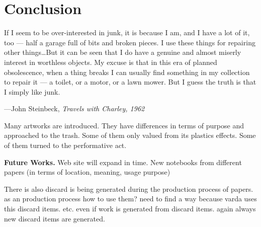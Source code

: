 \chapter{Conclusion}



\epigraph{If I seem to be over-interested in junk, it is because I am, and I have a lot of it, too --- half a garage full of bits and broken pieces. I use these things for repairing other things\ldots But it can be seen that I do have a genuine and almost miserly interest in worthless objects. My excuse is that in this era of planned obsolescence, when a thing breaks I can usually find something in my collection to repair it --- a toilet, or a motor, or a lawn mower. But I guess the truth is that I simply like junk.}{\hfill---John Steinbeck, \textit{Travels with Charley, 1962}}


Many artworks are introduced. They have differences in terms of purpose and approached to the trash. Some of them only valued from its plastics effects. Some of them turned to the performative act.

\textbf{Future Works.} Web site will expand in time. New notebooks from different papers (in terms of location, meaning, usage purpose)

There is also discard is being generated during the production process of papers. as an production process how to use them? need to find a way because varda uses this discard items. etc. even if work is generated from discard items. again always new discard items are generated.


